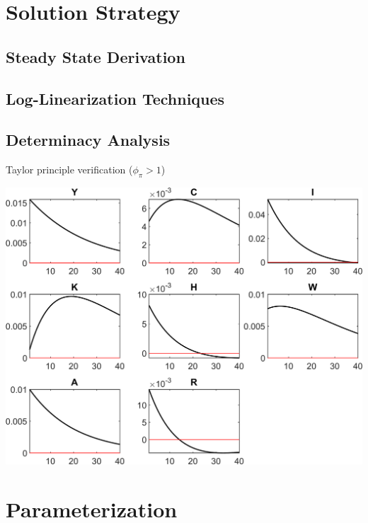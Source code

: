 \documentclass[11pt,preprint]{elsarticle}
\let\origfigure\figure
\let\endorigfigure\endfigure
\renewenvironment{figure}[1][2] {
    \expandafter\origfigure\expandafter[H]
} {
    \endorigfigure
}
\numberwithin{equation}{section}
\numberwithin{figure}{section}
\numberwithin{table}{section}
\begin{document}
\section{Solution Strategy}\label{solution-strategy}

\subsection{Steady State Derivation}\label{steady-state-derivation}

\subsection{Log-Linearization
Techniques}\label{log-linearization-techniques}

\subsection{Determinacy Analysis}\label{determinacy-analysis}

Taylor principle verification (\(\phi_\pi > 1\))

\begin{figure}
\centering
\includegraphics{code/rbc_model/rbc_model/graphs/rbc_model_IRF_eps_cropped.png}
\caption{image}
\end{figure}

\section{Parameterization}\label{parameterization}
\end{document}
